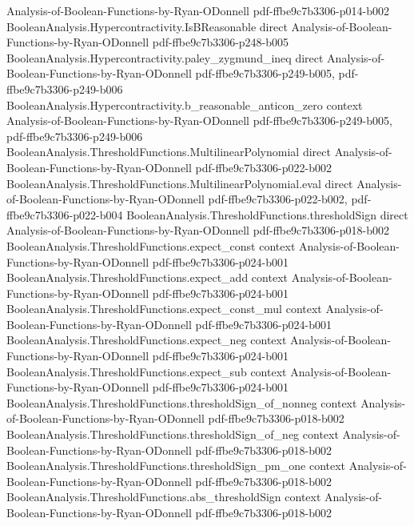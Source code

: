 \begin{theorem}
  {Analysis-of-Boolean-Functions-by-Ryan-ODonnell}
  {pdf-ffbe9c7b3306-p014-b002}
\proofstep
  {BooleanAnalysis.Hypercontractivity.IsBReasonable}
  {direct}
  {Analysis-of-Boolean-Functions-by-Ryan-ODonnell}
  {pdf-ffbe9c7b3306-p248-b005}
\proofstep
  {BooleanAnalysis.Hypercontractivity.paley_zygmund_ineq}
  {direct}
  {Analysis-of-Boolean-Functions-by-Ryan-ODonnell}
  {pdf-ffbe9c7b3306-p249-b005,
    pdf-ffbe9c7b3306-p249-b006}
\proofstep
  {BooleanAnalysis.Hypercontractivity.b_reasonable_anticon_zero}
  {context}
  {Analysis-of-Boolean-Functions-by-Ryan-ODonnell}
  {pdf-ffbe9c7b3306-p249-b005,
    pdf-ffbe9c7b3306-p249-b006}
\proofstep
  {BooleanAnalysis.ThresholdFunctions.MultilinearPolynomial}
  {direct}
  {Analysis-of-Boolean-Functions-by-Ryan-ODonnell}
  {pdf-ffbe9c7b3306-p022-b002}
\proofstep
  {BooleanAnalysis.ThresholdFunctions.MultilinearPolynomial.eval}
  {direct}
  {Analysis-of-Boolean-Functions-by-Ryan-ODonnell}
  {pdf-ffbe9c7b3306-p022-b002,
    pdf-ffbe9c7b3306-p022-b004}
\proofstep
  {BooleanAnalysis.ThresholdFunctions.thresholdSign}
  {direct}
  {Analysis-of-Boolean-Functions-by-Ryan-ODonnell}
  {pdf-ffbe9c7b3306-p018-b002}
\proofstep
  {BooleanAnalysis.ThresholdFunctions.expect_const}
  {context}
  {Analysis-of-Boolean-Functions-by-Ryan-ODonnell}
  {pdf-ffbe9c7b3306-p024-b001}
\proofstep
  {BooleanAnalysis.ThresholdFunctions.expect_add}
  {context}
  {Analysis-of-Boolean-Functions-by-Ryan-ODonnell}
  {pdf-ffbe9c7b3306-p024-b001}
\proofstep
  {BooleanAnalysis.ThresholdFunctions.expect_const_mul}
  {context}
  {Analysis-of-Boolean-Functions-by-Ryan-ODonnell}
  {pdf-ffbe9c7b3306-p024-b001}
\proofstep
  {BooleanAnalysis.ThresholdFunctions.expect_neg}
  {context}
  {Analysis-of-Boolean-Functions-by-Ryan-ODonnell}
  {pdf-ffbe9c7b3306-p024-b001}
\proofstep
  {BooleanAnalysis.ThresholdFunctions.expect_sub}
  {context}
  {Analysis-of-Boolean-Functions-by-Ryan-ODonnell}
  {pdf-ffbe9c7b3306-p024-b001}
\proofstep
  {BooleanAnalysis.ThresholdFunctions.thresholdSign_of_nonneg}
  {context}
  {Analysis-of-Boolean-Functions-by-Ryan-ODonnell}
  {pdf-ffbe9c7b3306-p018-b002}
\proofstep
  {BooleanAnalysis.ThresholdFunctions.thresholdSign_of_neg}
  {context}
  {Analysis-of-Boolean-Functions-by-Ryan-ODonnell}
  {pdf-ffbe9c7b3306-p018-b002}
\proofstep
  {BooleanAnalysis.ThresholdFunctions.thresholdSign_pm_one}
  {context}
  {Analysis-of-Boolean-Functions-by-Ryan-ODonnell}
  {pdf-ffbe9c7b3306-p018-b002}
\proofstep
  {BooleanAnalysis.ThresholdFunctions.abs_thresholdSign}
  {context}
  {Analysis-of-Boolean-Functions-by-Ryan-ODonnell}
  {pdf-ffbe9c7b3306-p018-b002}

\end{theorem}
